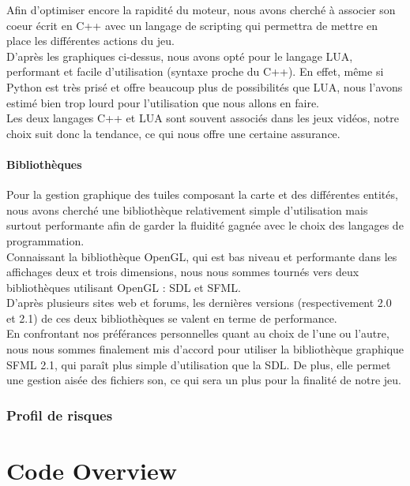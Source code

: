 \documentclass[a4paper]{article}
\newcommand{\alinea}{\hspace*{0.5cm}}
\begin{document}
        \alinea Afin d'optimiser encore la rapidité du moteur, nous avons cherché à associer son coeur écrit en C++ avec un langage de scripting qui permettra de mettre en place les différentes actions du jeu.\\ D'après les graphiques ci-dessus, nous avons opté pour le langage LUA, performant et facile d'utilisation (syntaxe proche du C++). En effet, même si Python est très prisé et offre beaucoup plus de possibilités que LUA, nous l'avons estimé bien trop lourd pour l'utilisation que nous allons en faire.\\
        \alinea Les deux langages C++ et LUA sont souvent associés dans les jeux vidéos, notre choix suit donc la tendance, ce qui nous offre une certaine assurance.

      \subsection{Bibliothèques}
        \alinea Pour la gestion graphique des tuiles composant la carte et des différentes entités, nous avons cherché une bibliothèque relativement simple d'utilisation mais surtout performante afin de garder la fluidité gagnée avec le choix des langages de programmation.\\
        \alinea Connaissant la bibliothèque OpenGL, qui est bas niveau et performante dans les affichages deux et trois dimensions, nous nous sommes tournés vers deux bibliothèques utilisant OpenGL : SDL et SFML.\\
        \alinea D'après plusieurs sites web et forums, les dernières versions (respectivement 2.0 et 2.1) de ces deux bibliothèques se valent en terme de performance.\\
        \alinea En confrontant nos préférances personnelles quant au choix de l'une ou l'autre, nous nous sommes finalement mis d'accord pour utiliser la bibliothèque graphique SFML 2.1, qui paraît plus simple d'utilisation que la SDL. De plus, elle permet une gestion aisée des fichiers son, ce qui sera un plus pour la finalité de notre jeu.

    \section{Profil de risques}
		
\newpage
  \part{Code Overview}
\end{document}
